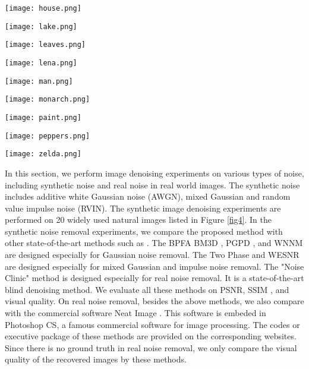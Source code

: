 \documentclass[runningheads]{llncs}
\begin{document}
\begin{figure*}[t]
{\begin{minipage}{0.09\textwidth}
\texttt{[image: house.png]}
\end{minipage}
\begin{minipage}{0.09\textwidth}
\texttt{[image: lake.png]}
\end{minipage}
\begin{minipage}{0.09\textwidth}
\texttt{[image: leaves.png]}
\end{minipage}
\begin{minipage}{0.09\textwidth}
\texttt{[image: lena.png]}
\end{minipage}
\begin{minipage}{0.09\textwidth}
\texttt{[image: man.png]}
\end{minipage}
\begin{minipage}{0.09\textwidth}
\texttt{[image: monarch.png]}
\end{minipage}
\begin{minipage}{0.09\textwidth}
\texttt{[image: paint.png]}
\end{minipage}
\begin{minipage}{0.09\textwidth}
\texttt{[image: peppers.png]}
\end{minipage}
\begin{minipage}{0.09\textwidth}
\texttt{[image: zelda.png]}
\end{minipage}
}\vspace{-0.1in}
\caption{The 20 widely used test images.}
\label{fig4}\vspace{-0.2in}
\end{figure*}
In this section, we perform image denoising experiments on various types of noise, including synthetic noise and real noise in real world images. The synthetic noise includes additive white Gaussian noise (AWGN), mixed Gaussian and random value impulse noise (RVIN). The synthetic image denoising experiments are performed on 20 widely used natural images listed in Figure \ref{fig4}. In the synthetic noise removal experiments, we compare the proposed method with other state-of-the-art methods such as \cite{bpfa,bm3d,pgpd,wnnm,cai2010fast,wesnr,noiseclinic}. The BPFA \cite{bpfa} BM3D \cite{bm3d}, PGPD \cite{pgpd}, and WNNM \cite{wnnm} are designed especially for Gaussian noise removal. The Two Phase \cite{cai2010fast} and WESNR \cite{wesnr} are designed especially for mixed Gaussian and impulse noise removal. The "Noise Clinic" method \cite{noiseclinic} is designed especially for real noise removal. It is a state-of-the-art blind denoising method. We evaluate all these methods on PSNR, SSIM \cite{ssim}, and visual quality. On real noise removal, besides the above methods, we also compare with the commercial software Neat Image \cite{neatimage}. This software is embeded in Photoshop CS, a famous commercial software for image processing. The codes or executive package of these methods are provided on the corresponding websites. Since there is no ground truth in real noise removal, we only compare the visual quality of the recovered images by these methods.
\end{document}
